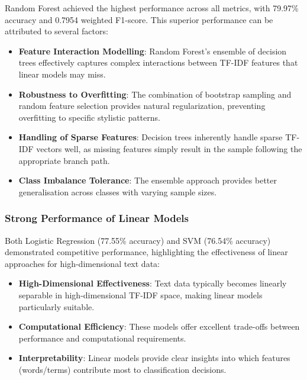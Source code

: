 \documentclass[11pt,a4paper]{article}
\begin{document}
Random Forest achieved the highest performance across all metrics, with 79.97\% accuracy and 0.7954 weighted F1-score. This superior performance can be attributed to several factors:

\begin{itemize}
    \item \textbf{Feature Interaction Modelling}: Random Forest's ensemble of decision trees effectively captures complex interactions between TF-IDF features that linear models may miss.
    
    \item \textbf{Robustness to Overfitting}: The combination of bootstrap sampling and random feature selection provides natural regularization, preventing overfitting to specific stylistic patterns.
    
    \item \textbf{Handling of Sparse Features}: Decision trees inherently handle sparse TF-IDF vectors well, as missing features simply result in the sample following the appropriate branch path.
    
    \item \textbf{Class Imbalance Tolerance}: The ensemble approach provides better generalisation across classes with varying sample sizes.
\end{itemize}

\subsubsection{Strong Performance of Linear Models}

Both Logistic Regression (77.55\% accuracy) and SVM (76.54\% accuracy) demonstrated competitive performance, highlighting the effectiveness of linear approaches for high-dimensional text data:

\begin{itemize}
    \item \textbf{High-Dimensional Effectiveness}: Text data typically becomes linearly separable in high-dimensional TF-IDF space, making linear models particularly suitable.
    
    \item \textbf{Computational Efficiency}: These models offer excellent trade-offs between performance and computational requirements.
    
    \item \textbf{Interpretability}: Linear models provide clear insights into which features (words/terms) contribute most to classification decisions.
\end{itemize}
\end{document}
